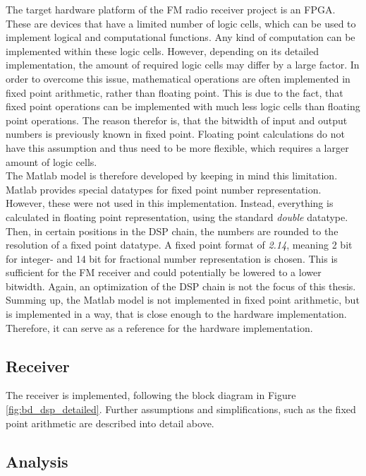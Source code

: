 The target hardware platform of the FM radio receiver project is an FPGA.
These are devices that have a limited number of logic cells, which can be used to implement logical and computational functions.
Any kind of computation can be implemented within these logic cells.
However, depending on its detailed implementation, the amount of required logic cells may differ by a large factor.
In order to overcome this issue, mathematical operations are often implemented in fixed point arithmetic, rather than floating point.
This is due to the fact, that fixed point operations can be implemented with much less logic cells than floating point operations.
The reason therefor is, that the bitwidth of input and output numbers is previously known in fixed point.
Floating point calculations do not have this assumption and thus need to be more flexible, which requires a larger amount of logic cells.\\

The Matlab model is therefore developed by keeping in mind this limitation.
Matlab provides special datatypes for fixed point number representation.
However, these were not used in this implementation.
Instead, everything is calculated in floating point representation, using the standard \textit{double} datatype.
Then, in certain positions in the DSP chain, the numbers are rounded to the resolution of a fixed point datatype.
A fixed point format of \textit{2.14}, meaning 2 bit for integer- and 14 bit for fractional number representation is chosen.
This is sufficient for the FM receiver and could potentially be lowered to a lower bitwidth.
Again, an optimization of the DSP chain is not the focus of this thesis.\\

Summing up, the Matlab model is not implemented in fixed point arithmetic, but is implemented in a way, that is close enough to the hardware implementation.
Therefore, it can serve as a reference for the hardware implementation.


\subsection{Receiver}

The receiver is implemented, following the block diagram in Figure \ref{fig:bd_dsp_detailed}.
Further assumptions and simplifications, such as the fixed point arithmetic are described into detail above.

\subsection{Analysis}

